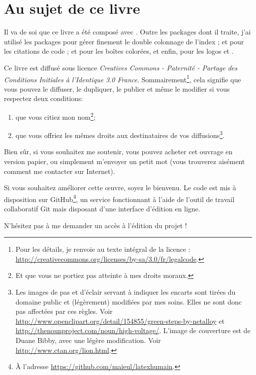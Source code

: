 \section*{Au sujet de ce livre}\thispagestyle{plain}

Il va de soi que ce livre a été composé avec \XeLaTeX. Outre les packages dont il traite, j'ai utilisé les packages  pour gérer finement le double colonnage de l'index ;  et  pour les citations de code ;  et  pour les boîtes colorées, et enfin,  pour les logos \XeLaTeX et \XeTeX.



Ce livre est diffusé sous licence \emph{Creatives Commons - Paternité - Partage des Conditions Initiales à l'Identique 3.0 France}. Sommairement\footnote{Pour les détails, je renvoie au texte intégral de la licence : \url{http://creativecommons.org/licenses/by-sa/3.0/fr/legalcode}.}, cela signifie que vous pouvez le diffuser, le dupliquer, le publier et même le modifier si vous respectez deux conditions:
\begin{enumerate}
\item que vous citiez mon nom\footnote{Et que vous ne portiez  pas atteinte à mes droits moraux.};
\item que vous offriez les mêmes droits aux destinataires de vos diffusions\footnote{Les images de pas et d'éclair servant à indiquer les encarts sont tirées du domaine public et (légèrement) modifiées par mes soins. Elles ne sont donc pas affectées par ces règles. Voir \url{http://www.openclipart.org/detail/154855/green-steps-by-netalloy} et \url{http://thenounproject.com/noun/high-voltage/}. L'image de couverture est de Duane  Bibby, avec une légère modification. Voir \url{http://www.ctan.org/lion.html}.}.
\end{enumerate}

Bien sûr, si vous souhaitez me soutenir, vous pouvez acheter cet ouvrage en version papier, ou simplement m'envoyer un petit mot (vous trouverez aisément comment me contacter sur Internet).

Si vous souhaitez améliorer cette œuvre, soyez le bienvenu. Le code est mis à disposition sur GitHub\footnote{À l'adresse \url{https://github.com/maieul/latexhumain}.}, un service fonctionnant à l'aide de l'outil de travail collaboratif Git mais disposant d'une interface d'édition en ligne. 

N'hésitez pas à me demander un accès à l'édition du projet ! 

